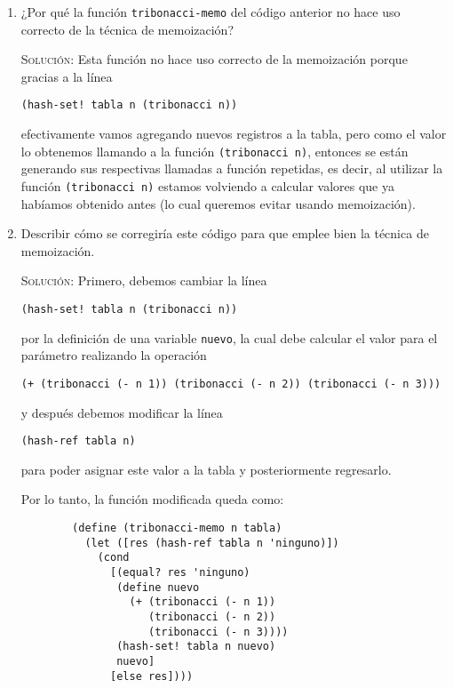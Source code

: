 \documentclass[letterpaper,11pt]{article}
\begin{document}
\begin{enumerate}
    \begin{enumerate}
        \item ¿Por qué la función \texttt{tribonacci-memo} del código anterior 
        no hace uso correcto de la técnica de memoización?

        \textsc{Solución:} Esta función no hace uso correcto de la memoización
        porque gracias a la línea 
        \begin{center}
            \texttt{(hash-set! tabla n (tribonacci n))}
        \end{center}

        efectivamente vamos agregando nuevos registros a la tabla, pero como 
        el valor lo obtenemos llamando a la función \texttt{(tribonacci n)}, 
        entonces se están generando sus respectivas llamadas a función 
        repetidas, es decir, al utilizar la función \texttt{(tribonacci n)} 
        estamos volviendo a calcular valores que ya habíamos obtenido antes 
        (lo cual queremos evitar usando memoización).

        \item Describir cómo se corregiría este código para que emplee bien la 
        técnica de memoización.
        
        \textsc{Solución:} Primero, debemos cambiar la línea 
        \begin{center}
            \texttt{(hash-set! tabla n (tribonacci n))}    
        \end{center}

        por la definición de una variable \texttt{nuevo}, la cual debe calcular 
        el valor para el parámetro realizando la operación
        \begin{center}
            \texttt{(+ (tribonacci (- n 1)) (tribonacci (- n 2)) 
            (tribonacci (- n 3)))}
        \end{center}
        
        y después debemos modificar la línea
        \begin{center}
            \texttt{(hash-ref tabla n)}
        \end{center}

        para poder asignar este valor a la tabla y posteriormente regresarlo.
        
        Por lo tanto, la función modificada queda como:
        \begin{verbatim}
        (define (tribonacci-memo n tabla)
          (let ([res (hash-ref tabla n 'ninguno)])
            (cond
              [(equal? res 'ninguno)
               (define nuevo
                 (+ (tribonacci (- n 1)) 
                    (tribonacci (- n 2)) 
                    (tribonacci (- n 3))))
               (hash-set! tabla n nuevo)
               nuevo]
              [else res])))
        \end{verbatim}
    \end{enumerate}

\end{enumerate}
\end{document}
